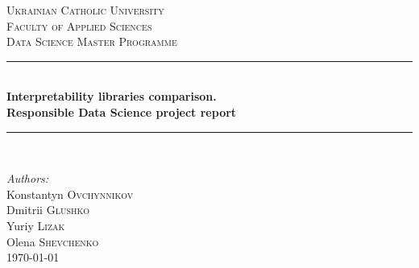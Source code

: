 \begin{titlepage}

\newcommand{\HRule}{\rule{\linewidth}{0.5mm}} %

\center %
 
\vspace*{0.5cm}
\textsc{\LARGE Ukrainian Catholic University}\\[1cm] %
\textsc{\Large  Faculty of Applied Sciences}\\[0.5cm] %
\textsc{\large Data Science Master Programme}\\[0.5cm] %

\vspace*{1.5cm}

\HRule \\[0.4cm]
{ \huge \bfseries Interpretability libraries comparison.}\\[10pt]
{\Large \bfseries Responsible Data Science project report}\\[0.4cm] %
\HRule \\[1cm]
 
\vspace*{2.5cm}

\Large \emph{Authors:}\\
Konstantyn  \textsc{Ovchynnikov}\\
Dmitrii \textsc{Glushko}\\
Yuriy \textsc{Lizak}\\
Olena \textsc{Shevchenko}\\[1cm] %

\vspace*{0.5cm}
{\large \today}\\[0.5cm] %


\end{titlepage}

